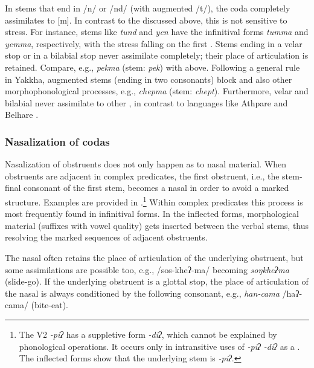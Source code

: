 In stems that end in /n/ or /nd/ (with augmented /t/), the coda completely assimilates to [m]. In contrast to the  discussed above, this  is not sensitive to stress. For instance, stems like \emph{tund}  and \emph{yen}  have the infinitival forms \emph{tumma} and \emph{yemma}, respectively, with the stress falling on the first . Stems ending in a velar stop or in a bilabial stop never assimilate completely; their place of articulation is retained. Compare, e.g., \emph{pekma}  (stem: \emph{pek}) with \Last[b] above. Following a general rule in Yakkha, augmented stems (ending in two consonants) block  and also other morphophonological processes, e.g., \emph{chepma}  (stem: \emph{chept}). Furthermore, velar and bilabial  never assimilate to other , in contrast to languages like Athpare and  Belhare \citep{Ebert1997A-grammar, Bickel2003Belhare}.


\subsubsection{Nasalization of codas}\label{nas-cod}

Nasalization of obstruents does not only happen as  to nasal material. When obstruents are adjacent in complex predicates, the first obstruent, i.e., the stem-final consonant of the first stem, becomes a nasal in order to avoid a marked structure. Examples are provided in  .\footnote{The V2 \emph{-piʔ} has a suppletive form \emph{-diʔ}, which cannot be explained by phonological operations. It occurs only in intransitive uses of \emph{-piʔ \ti -diʔ}  as a . The inflected forms show that the underlying stem is \emph{-piʔ}.} Within complex predicates this process is most frequently found in infinitival forms. In the inflected forms, morphological material (suffixes with vowel quality) gets inserted between the verbal stems, thus resolving the marked sequences of adjacent obstruents.

The nasal often retains the place of articulation of the underlying obstruent, but some assimilations are possible too, e.g., /sos-kheʔ-ma/ becoming \emph{soŋkheʔma}  (slide-go). If the underlying obstruent is a glottal stop, the place of articulation of the nasal is always conditioned by the following consonant, e.g., \emph{han-cama} /haʔ-cama/  (bite-eat). 

